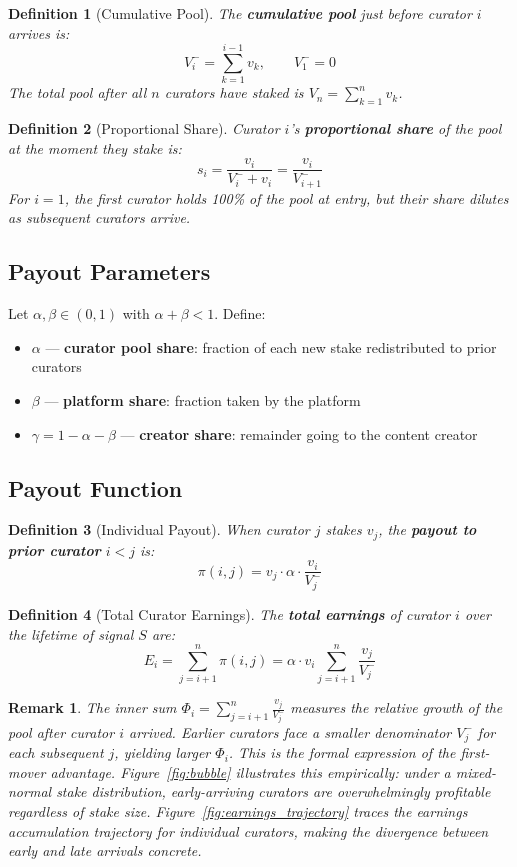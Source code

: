 \documentclass[12pt]{article}
\newtheorem{definition}{Definition}
\newtheorem{remark}{Remark}
\begin{document}
\begin{definition}[Cumulative Pool]
The \textbf{cumulative pool} just before curator $i$ arrives is:
\[
  V_i^- = \sum_{k=1}^{i-1} v_k, \qquad V_1^- = 0
\]
The total pool after all $n$ curators have staked is $V_n = \sum_{k=1}^{n} v_k$.
\end{definition}

\begin{definition}[Proportional Share]
Curator $i$'s \textbf{proportional share} of the pool at the moment they stake is:
\[
  s_i = \frac{v_i}{V_i^- + v_i} = \frac{v_i}{V_{i+1}^-}
\]
For $i = 1$, the first curator holds 100\% of the pool at entry, but their share dilutes as subsequent curators arrive.
\end{definition}

\subsection{Payout Parameters}

Let $\alpha, \beta \in (0,1)$ with $\alpha + \beta < 1$. Define:
\begin{itemize}
  \item $\alpha$ --- \textbf{curator pool share}: fraction of each new stake redistributed to prior curators
  \item $\beta$ --- \textbf{platform share}: fraction taken by the platform
  \item $\gamma = 1 - \alpha - \beta$ --- \textbf{creator share}: remainder going to the content creator
\end{itemize}

\subsection{Payout Function}

\begin{definition}[Individual Payout]
When curator $j$ stakes $v_j$, the \textbf{payout to prior curator} $i < j$ is:
\[
  \pi(i,j) = v_j \cdot \alpha \cdot \frac{v_i}{V_j^-}
\]
\end{definition}

\begin{definition}[Total Curator Earnings]
The \textbf{total earnings} of curator $i$ over the lifetime of signal $S$ are:
\[
  E_i = \sum_{j=i+1}^{n} \pi(i,j) = \alpha \cdot v_i \sum_{j=i+1}^{n} \frac{v_j}{V_j^-}
\]
\end{definition}

\begin{remark}
The inner sum $\Phi_i = \sum_{j=i+1}^{n} \frac{v_j}{V_j^-}$ measures the \emph{relative growth} of the pool after curator $i$ arrived. Earlier curators face a smaller denominator $V_j^-$ for each subsequent $j$, yielding larger $\Phi_i$. This is the formal expression of the first-mover advantage. Figure~\ref{fig:bubble} illustrates this empirically: under a mixed-normal stake distribution, early-arriving curators are overwhelmingly profitable regardless of stake size. Figure~\ref{fig:earnings_trajectory} traces the earnings accumulation trajectory for individual curators, making the divergence between early and late arrivals concrete.
\end{remark}
\end{document}
